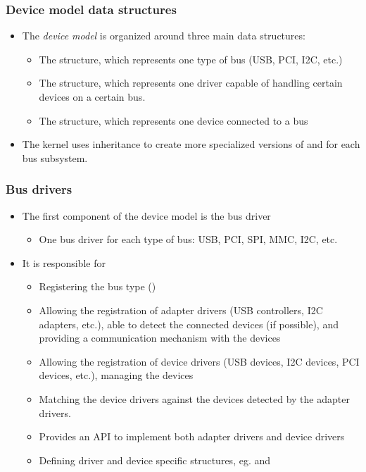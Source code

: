 \begin{frame}
  \frametitle{Device model data structures}
  \begin{itemize}
  \item The {\em device model} is organized around three main data
    structures:
    \begin{itemize}
    \item The  structure, which represents one type of bus
      (USB, PCI, I2C, etc.)
    \item The  structure, which represents one driver
      capable of handling certain devices on a certain bus.
    \item The  structure, which represents one device
      connected to a bus
    \end{itemize}
  \item The kernel uses inheritance to create more specialized
    versions of  and 
    for each bus subsystem.
  \end{itemize}
\end{frame}

\begin{frame}
  \frametitle{Bus drivers}
  \begin{itemize}
  \item The first component of the device model is the bus driver
    \begin{itemize}
    \item One bus driver for each type of bus: USB, PCI, SPI, MMC,
      I2C, etc.
    \end{itemize}
  \item It is responsible for
    \begin{itemize}
    \item Registering the bus type ()
    \item Allowing the registration of adapter drivers (USB
      controllers, I2C adapters, etc.), able to detect the
      connected devices (if possible), and providing a
      communication mechanism with the devices
    \item Allowing the registration of device drivers (USB devices,
      I2C devices, PCI devices, etc.), managing the devices
    \item Matching the device drivers against the devices detected by
      the adapter drivers.
    \item Provides an API to implement both adapter drivers and device drivers
    \item Defining driver and device specific structures, eg.
       and 
    \end{itemize}
  \end{itemize}
\end{frame}

